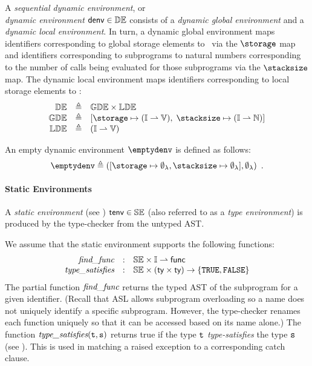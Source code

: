 \hypertarget{def-dynamicenvs}{}
\begin{definition}
A \emph{sequential dynamic environment}, or \\ \emph{dynamic environment}
$\textsf{denv} \in \mathbb{DE}$
consists of a \emph{dynamic global environment} and a \emph{dynamic local environment}.
\hypertarget{def-stacksize}{}
\hypertarget{def-storage}{}
In turn, a dynamic global environment maps identifiers corresponding to global storage elements to \nativevalues\
via the $\storage$ map and identifiers corresponding to subprograms to natural numbers corresponding
to the number of calls being evaluated for those subprograms via the $\stacksize$ map.
The dynamic local environment maps identifiers corresponding to local storage elements to \nativevalues:
\[
\begin{array}{rcl}
\dynamicenvs        &\triangleq&  \globaldynamicenvs \times \localdynamicenvs
  \hypertarget{def-globaldynamicenvs}{}\\
\globaldynamicenvs  &\triangleq&  [\storage \mapsto (\Identifiers \partialto \vals),\; \stacksize \mapsto (\Identifiers \partialto \N)]
  \hypertarget{def-localdynamicenvs}{}\\
\localdynamicenvs   &\triangleq&  (\Identifiers \partialto \vals) \\
\end{array}
\]
\end{definition}

\hypertarget{def-emptydenv}{}
An empty dynamic environment $\emptydenv$ is defined as follows:
\[
\emptydenv \triangleq ([\storage \mapsto \emptyfunc, \stacksize \mapsto \emptyfunc], \emptyfunc) \enspace.
\]

\paragraph{Static Environments}
A \emph{static environment} (see ) $\textsf{tenv} \in \mathbb{SE}$ (also referred to as a \emph{type environment})
is produced by the type-checker from the untyped AST.

We assume that the static environment supports the following functions:
\hypertarget{def-findfunc}{}
\[
  \begin{array}{rcl}
    \textit{find\_func}       &:& \mathbb{SE} \times \mathbb{I} \rightharpoonup \textsf{func}\\
    \textit{type\_satisfies}  &:& \mathbb{SE} \times (\textsf{ty} \times \textsf{ty}) \rightarrow \{\texttt{TRUE}, \texttt{FALSE}\}
  \end{array}
\]
The partial function $\textit{find\_func}$ returns the typed AST of the subprogram for a given identifier.
(Recall that ASL allows subprogram overloading so a name does not uniquely identify
a specific subprogram.
However, the type-checker renames each function uniquely so that it can be accessed based
on its name alone.)
%
The function $\textit{type\_satisfies}(\texttt{t}, \texttt{s})$ returns true
if the type $\texttt{t}$ \emph{type-satisfies} the type $\texttt{s}$
(see ).
This is used in matching a raised exception to a corresponding catch clause.

